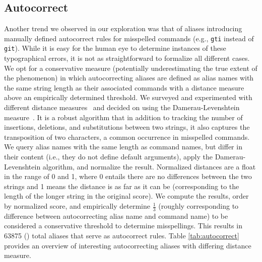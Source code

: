 \subsection{Autocorrect}

Another trend we observed in our exploration was that of aliases introducing manually defined autocorrect rules for misspelled commands (e.g., \verb|gti| instead of \verb|git|).
While it is easy for the human eye to determine instances of these typographical errors, it is not as straightforward to formalize all different cases.
We opt for a conservative measure (potentially underestimating the true extent of the phenomenon) in which autocorrecting aliases are defined as alias names with the same string length as their associated commands with a distance measure above an empirically determined threshold.
We surveyed and experimented with different distance measures~\cite{navarro:01} and decided on using the Damerau-Levenshtein measure~\cite{damerau:64}.
It is a robust algorithm that in addition to tracking the number of insertions, deletions, and substitutions between two strings, it also captures the transposition of two characters, a common occurrence in misspelled commands.  
We query alias names with the same length as command names, but differ in their content (i.e., they do not define default arguments), apply the Damerau-Levenshtein algorithm, and normalize the result.
Normalized distances are a float in the range of 0 and 1, where 0 entails there are no differences between the two strings and 1 means the distance is as far as it can be (corresponding to the length of the longer string in the original score).
We compute the results, order by normalized score, and empirically determine $\frac{1}{3}$ (roughly corresponding to  difference between autocorrecting alias name and command name) to be considered a conservative threshold to determine misspellings.
This results in \num{63875} () total aliases that serve as autocorrect rules.
Table \ref{tab:autocorrect} provides an overview of interesting autocorrecting aliases with differing distance measure.

